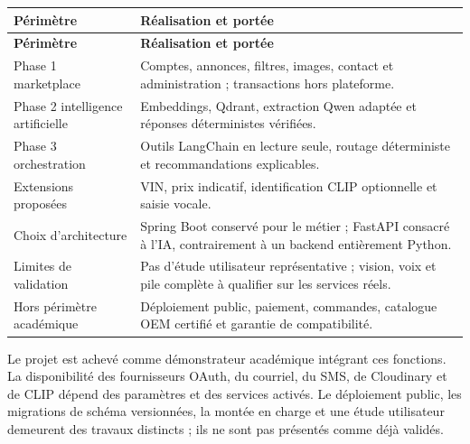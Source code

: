 {\small\singlespacing{}
\begin{longtable}{|>{\raggedright\arraybackslash}p{}|>{\raggedright\arraybackslash}p{}|}
\hline
\rowcolor{tablehead} \color{white}\bfseries Périmètre & \color{white}\bfseries Réalisation et portée \\ \hline
\endfirsthead
\rowcolor{tablehead} \color{white}\bfseries Périmètre & \color{white}\bfseries Réalisation et portée \\ \hline
\endhead
\hline\endfoot
Phase 1 marketplace & Comptes, annonces, filtres, images, contact et administration ; transactions hors plateforme. \\ \hline
\rowcolor{tablerow} Phase 2 intelligence artificielle & Embeddings, Qdrant, extraction Qwen adaptée et réponses déterministes vérifiées. \\ \hline
Phase 3 orchestration & Outils LangChain en lecture seule, routage déterministe et recommandations explicables. \\ \hline
\rowcolor{tablerow} Extensions proposées & VIN, prix indicatif, identification CLIP optionnelle et saisie vocale. \\ \hline
Choix d'architecture & Spring Boot conservé pour le métier ; FastAPI consacré à l'IA, contrairement à un backend entièrement Python. \\ \hline
\rowcolor{tablerow} Limites de validation & Pas d'étude utilisateur représentative ; vision, voix et pile complète à qualifier sur les services réels. \\ \hline
Hors périmètre académique & Déploiement public, paiement, commandes, catalogue OEM certifié et garantie de compatibilité. \\ \hline
\end{longtable}
}


Le projet est achevé comme démonstrateur académique intégrant ces fonctions. La disponibilité des fournisseurs OAuth, du courriel, du SMS, de Cloudinary et de CLIP dépend des paramètres et des services activés. Le déploiement public, les migrations de schéma versionnées, la montée en charge et une étude utilisateur demeurent des travaux distincts ; ils ne sont pas présentés comme déjà validés.
